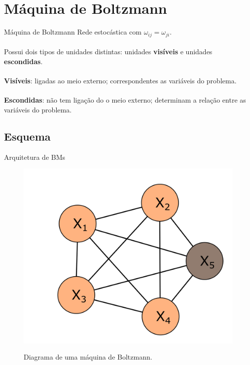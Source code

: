 \section{Máquina de Boltzmann}


\begin{frame}{Máquina de Boltzmann}%
  \justiying%
  Rede estocástica com $\omega_{ij} = \omega_{ji}$.
  \\~\\
  Possui dois tipos de unidades distintas: unidades \textbf{visíveis} e unidades \textbf{escondidas}.
  \\~\\
  \textbf{Visíveis}: ligadas ao meio externo; correspondentes as variáveis do problema.
  \\~\\
  \textbf{Escondidas}: não tem ligação do o meio externo; determinam a relação entre as variáveis do problema.
\end{frame}

\subsection{Esquema}
\begin{frame}{Arquitetura de BMs}%
  \begin{figure}[h]{}%
    \label{fig:bm-diagram}%
    \includegraphics[scale=0.5]{images/bm_1.png}
    \caption{Diagrama de uma máquina de Boltzmann.\\
            \;}
  \end{figure}
\end{frame}

